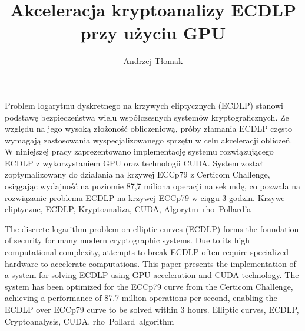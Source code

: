 \documentclass[
    left=2.5cm,         %
    right=2.5cm,        %
    top=2.5cm,          %
    bottom=3cm,         %
    bindingoffset=6mm,  %
    nohyphenation=true %
]{eiti/eiti-thesis} %
\begin{document}
\RaportThesis
{}
\title{
    Akceleracja kryptoanalizy ECDLP przy użyciu GPU
}
\author{Andrzej Tłomak}
\date{\the\year}
\maketitle

\streszczenie
Problem logarytmu dyskretnego na krzywych eliptycznych (ECDLP) stanowi podstawę
bezpieczeństwa wielu współczesnych systemów kryptograficznych.
Ze względu na jego wysoką złożoność obliczeniową,
próby złamania ECDLP często wymagają zastosowania wyspecjalizowanego sprzętu w celu akceleracji obliczeń.
W niniejszej pracy zaprezentowano implementację systemu rozwiązującego ECDLP
z wykorzystaniem GPU oraz technologii CUDA.
System został zoptymalizowany do działania na krzywej ECCp79 z Certicom Challenge,
osiągając wydajność na poziomie 87,7 miliona operacji na sekundę,
co pozwala na rozwiązanie problemu ECDLP na krzywej ECCp79 w ciągu 3 godzin.
\slowakluczowe Krzywe eliptyczne, ECDLP, Kryptoanaliza, CUDA, Algorytm~rho~Pollard'a
\newpage

\abstract
The discrete logarithm problem on elliptic curves (ECDLP) forms the foundation of
security for many modern cryptographic systems.
Due to its high computational complexity, attempts to break ECDLP often
require specialized hardware to accelerate computations.
This paper presents the implementation of a system for solving ECDLP using GPU acceleration and CUDA technology.
The system has been optimized for the ECCp79 curve from the Certicom Challenge,
achieving a performance of 87.7 million operations per second,
enabling the ECDLP over ECCp79 curve to be solved within 3 hours.
\keywords Elliptic curves, ECDLP, Cryptoanalysis, CUDA, rho~Pollard~algorithm
\newpage

\thispagestyle{empty}
\tableofcontents
\end{document}
